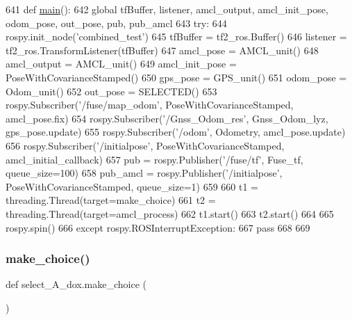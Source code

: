 \begin{DoxyCode}
641 \textcolor{keyword}{def }\hyperlink{namespaceselect___a__dox_a3b1a91ee1ddc60fac7981f8cb5ea0368}{main}():
642     \textcolor{keyword}{global} tfBuffer, listener, amcl\_output, amcl\_init\_pose, odom\_pose, out\_pose, pub, pub\_amcl
643     \textcolor{keywordflow}{try}:
644         rospy.init\_node(\textcolor{stringliteral}{'combined\_test'})
645         tfBuffer = tf2\_ros.Buffer()
646         listener = tf2\_ros.TransformListener(tfBuffer)
647         amcl\_pose = AMCL\_unit()
648         amcl\_output = AMCL\_unit()
649         amcl\_init\_pose = PoseWithCovarianceStamped()
650         gps\_pose = GPS\_unit()
651         odom\_pose = Odom\_unit()
652         out\_pose = SELECTED()
653         rospy.Subscriber(\textcolor{stringliteral}{'/fuse/map\_odom'}, PoseWithCovarianceStamped, amcl\_pose.fix)
654         rospy.Subscriber(\textcolor{stringliteral}{'/Gnss\_Odom\_res'}, Gnss\_Odom\_lyz, gps\_pose.update)
655         rospy.Subscriber(\textcolor{stringliteral}{'/odom'}, Odometry, amcl\_pose.update)
656         rospy.Subscriber(\textcolor{stringliteral}{'/initialpose'}, PoseWithCovarianceStamped, amcl\_initial\_callback)
657         pub = rospy.Publisher(\textcolor{stringliteral}{'/fuse/tf'}, Fuse\_tf, queue\_size=100)
658         pub\_amcl = rospy.Publisher(\textcolor{stringliteral}{'/initialpose'}, PoseWithCovarianceStamped, queue\_size=1)
659 
660         t1 = threading.Thread(target=make\_choice)
661         t2 = threading.Thread(target=amcl\_process)
662         t1.start()
663         t2.start()
664 
665         rospy.spin()
666     \textcolor{keywordflow}{except} rospy.ROSInterruptException:
667         \textcolor{keywordflow}{pass}
668 
669 
\end{DoxyCode}
\mbox{\label{namespaceselect___a__dox_a0a0029d6640915baf31f3cb76c0658ab}} 
\subsubsection{\texorpdfstring{make\+\_\+choice()}{make\_choice()}}
{\footnotesize\ttfamily def select\+\_\+\+A\+\_\+dox.\+make\+\_\+choice (\begin{DoxyParamCaption}{ }\end{DoxyParamCaption})}



